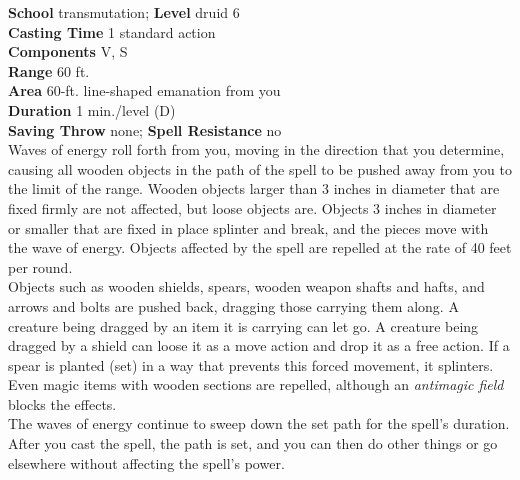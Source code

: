\textbf{School} transmutation; \textbf{Level} druid 6\\
\textbf{Casting Time} 1 standard action\\
\textbf{Components} V, S\\
\textbf{Range} 60 ft.\\
\textbf{Area} 60-ft. line-shaped emanation from you\\
\textbf{Duration} 1 min./level (D)\\
\textbf{Saving Throw} none; \textbf{Spell Resistance} no\\
Waves of energy roll forth from you, moving in the direction that you determine, causing all wooden objects in the path of the spell to be pushed away from you to the limit of the range. Wooden objects larger than 3 inches in diameter that are fixed firmly are not affected, but loose objects are. Objects 3 inches in diameter or smaller that are fixed in place splinter and break, and the pieces move with the wave of energy. Objects affected by the spell are repelled at the rate of 40 feet per round.\\
Objects such as wooden shields, spears, wooden weapon shafts and hafts, and arrows and bolts are pushed back, dragging those carrying them along. A creature being dragged by an item it is carrying can let go. A creature being dragged by a shield can loose it as a move action and drop it as a free action. If a spear is planted (set) in a way that prevents this forced movement, it splinters. Even magic items with wooden sections are repelled, although an \textit{antimagic field }blocks the effects.\\
The waves of energy continue to sweep down the set path for the spell's duration. After you cast the spell, the path is set, and you can then do other things or go elsewhere without affecting the spell's power.\\
